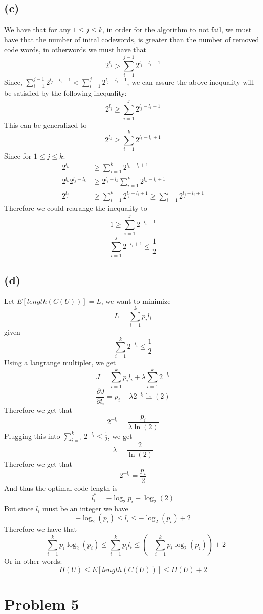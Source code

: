 \subsection*{(c)}
We have that for any $1\leq j\leq k$, in order for the algorithm to not fail, we must
have that the number of inital codewords, is greater than the number
of removed code words, in otherwords we must have that
$$2^{l_j}>\sum_{i=1}^{j-1}2^{l_j-l_i+1}$$
Since, $\sum_{i=1}^{j-1}2^{l_j-l_i+1}<\sum_{i=1}^{j}2^{l_j-l_i+1}$, we can
assure the above inequality will be satisfied by the following inequality:
$$2^{l_j}\geq\sum_{i=1}^j2^{l_j-l_i+1}$$
This can be generalized to 
$$2^{l_k}\geq\sum_{i=1}^k2^{l_k-l_i+1}$$
Since for $1\leq j \leq k$:
\begin{align*}
	2^{l_k}&\geq\sum_{i=1}^k2^{l_k-l_i+1}\\
	2^{l_k}2^{l_j-l_k}&\geq2^{l_j-l_k}\sum_{i=1}^k2^{l_k-l_i+1}\\
	2^{l_j}&\geq\sum_{i=1}^k2^{l_j-l_i+1}\geq \sum_{i=1}^j2^{l_j-l_i+1}
\end{align*}
Therefore we could rearange the inequality to 
$$1\geq\sum_{i=1}^j2^{-l_i+1}$$
$$\sum_{i=1}^j2^{-l_i+1}\leq\frac{1}{2}$$
\subsection*{(d)}
Let $E[length(C(U))]=L$, we want to minimize
$$L=\sum_{i=1}^k p_il_i$$
given
$$\sum_{i=1}^k 2^{-l_i}\leq\frac{1}{2}$$
Using a langrange multipler, we get
$$J=\sum_{i=1}^{k}p_il_i+\lambda\sum_{i=1}^k 2^{-l_i}$$
$$\frac{\partial J}{\partial l_i}=p_i-\lambda 2^{-l_i}\ln(2)$$
Therefore we get that
$$2^{-l_i}=\frac{p_i}{\lambda \ln(2)}$$
Plugging this into $\sum_{i=1}^{k}2^{-l_i}\leq\frac{1}{2}$, we get
$$\lambda=\frac{2}{\ln(2)}$$
Therefore we get that
$$2^{-l_i}=\frac{p_i}{2}$$
And thus the optimal code length is
$$l_i^*=-\log_2{p_i}+\log_2(2)$$
But since $l_i$ must be an integer we have
$$-\log_2(p_i)\leq l_i\leq-\log_2(p_i)+2$$
Therefore we have that
$$-\sum_{i=1}^k p_i\log_2(p_i)\leq \sum_{i=1}^k p_i l_i \leq \left(-\sum_{i=1}^k p_i\log_2(p_i)\right)+2$$
Or in other words:
$$H(U)\leq E[length(C(U))] \leq H(U)+2$$
\section*{Problem 5}
